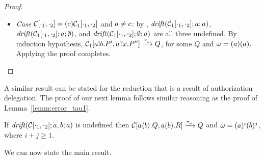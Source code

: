 \begin{proof}
\begin{itemize}
              \item \emph{Case}
             $\mathcal{C}[\cdot_1,\cdot_2] = (c) \mathcal{C}_1[\cdot_1, \cdot_2]$ and $a\neq c$: by , $\mathit {drift}(\mathcal{C}_1[\cdot_1, \cdot_2];a;a)$, $\mathit {drift}(\mathcal{C}_1[\cdot_1, \cdot_2];a;\emptyset)$,  and $\mathit {drift}(\mathcal{C}_1[\cdot_1, \cdot_2];\emptyset;a)$  are all three undefined.
             By induction hypothesis, $\mathcal{C}_1[a!b.P', a?x.P''] \xrightarrow{\tau_\omega} Q$, for some $Q$ and $\omega=(a) (a).$  Applying  the proof completes. %
         \end{itemize}
\end{proof}

A similar result can be stated for the reduction that is a result of authorization delegation. The proof of our next lemma follows similar reasoning as the proof of Lemma~\ref{lemm:error_tau1}.


\begin{lemma}
\label{lemm:error_tau2}
   If  $\mathit {drift}(\mathcal{C}[\cdot_1,\cdot_2];a,b;a)$  is undefined then %
   $\mathcal{C}[a\langle b\rangle.Q, a(b).R]\xrightarrow{\tau_\omega}Q$  and  %
   $\omega=(a)^i(b)^j$, where $i+j\geq 1$.
 \end{lemma}

We can now state the main result.

